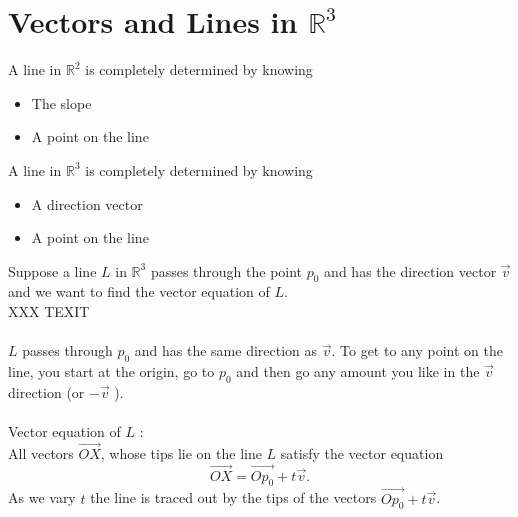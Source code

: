 \documentclass{report}
\begin{document}
\section{Vectors and Lines in $\mathbb{R}^3$}
A line in $\mathbb{R}^2 $ is completely determined by knowing 
\begin{itemize}
        \item The slope
        \item A point on the line
\end{itemize}
A line in $\mathbb{R}^3 $ is completely determined by knowing 
\begin{itemize}
        \item A direction vector
        \item A point on the line
\end{itemize}
Suppose a line $L$ in  $\mathbb{R}^3$ passes through the point $p_0$ and has the direction vector $\vec{v} $and we want to find the vector equation of $L$.\\
XXX TEXIT\\
\\
$L$ passes through $p_0$ and has the same direction as $\vec{v} $. To get to any point on the line, you start at the origin, go to $p_0$ and then go any amount you like in the $\vec{v} $ direction (or $-\vec{v} $ ).\\
\\
Vector equation of $L$ :\\
All vectors $\vec{OX} $, whose tips lie on the line $L$ satisfy the vector equation 
\[
\vec{OX} = \vec{Op_0} +t \vec{v} 
.\] As we vary $t$ the line is traced out by the tips of the vectors $\vec{Op_0} +t \vec{v} $.\\
\end{document}
